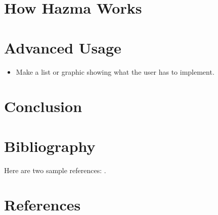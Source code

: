 \documentclass[review]{elsarticle}
\begin{document}


\section{How Hazma Works}%
\label{sec:how_hazma_works}

\section{Advanced Usage}%
\label{sec:advanced_usage}

\begin{itemize}
    \item Make a list or graphic showing what the user has to implement.
\end{itemize}

\section{Conclusion}%
\label{sec:conclusion}


\section{Bibliography}

Here are two sample references: \cite{Feynman1963118,Dirac1953888}.

\section*{References}


\end{document}
